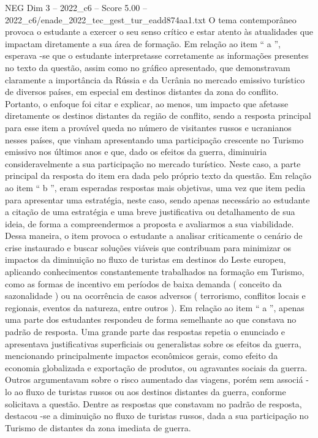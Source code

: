 \begin{textsample}{NEG Dim 3 – 2022\_c6 – Score 5.00 – 2022\_c6/enade\_2022\_tec\_gest\_tur\_eadd874aa1.txt}
O tema contemporâneo provoca o estudante a exercer o seu senso crítico e estar atento às atualidades que impactam diretamente a sua área de formação.
Em relação ao item “ a ”, esperava -se que o estudante interpretasse corretamente as informações presentes no texto da questão, assim como no gráfico apresentado, que demonstravam claramente a importância da Rússia e da Ucrânia no mercado emissivo turístico de diversos países, em especial em destinos distantes da zona do conflito.
Portanto, o enfoque foi citar e explicar, ao menos, um impacto que afetasse diretamente os destinos distantes da região de conflito, sendo a resposta principal para esse item a provável queda no número de visitantes russos e ucranianos nesses países, que vinham apresentando uma participação crescente no Turismo emissivo nos últimos anos e que, dado os efeitos da guerra, diminuiria consideravelmente a sua participação no mercado turístico.
Neste caso, a parte principal da resposta do item era dada pelo próprio texto da questão.
Em relação ao item “ b ”, eram esperadas respostas mais objetivas, uma vez que item pedia para apresentar uma estratégia, neste caso, sendo apenas necessário ao estudante a citação de uma estratégia e uma breve justificativa ou detalhamento de sua ideia, de forma a compreendermos a proposta e avaliarmos a sua viabilidade.
Dessa maneira, o item provoca o estudante a analisar criticamente o cenário de crise instaurado e buscar soluções viáveis que contribuam para minimizar os impactos da diminuição no fluxo de turistas em destinos do Leste europeu, aplicando conhecimentos constantemente trabalhados na formação em Turismo, como as formas de incentivo em períodos de baixa demanda ( conceito da sazonalidade ) ou na ocorrência de casos adversos ( terrorismo, conflitos locais e regionais, eventos da natureza, entre outros ).
Em relação ao item “ a ”, apenas uma parte dos estudantes respondeu de forma semelhante ao que constava no padrão de resposta.
Uma grande parte das respostas repetia o enunciado e apresentava justificativas superficiais ou generalistas sobre os efeitos da guerra, mencionando principalmente impactos econômicos gerais, como efeito da economia globalizada e exportação de produtos, ou agravantes sociais da guerra.
Outros argumentavam sobre o risco aumentado das viagens, porém sem associá -lo ao fluxo de turistas russos ou aos destinos distantes da guerra, conforme solicitava a questão.
Dentre as respostas que constavam no padrão de resposta, destacou -se a diminuição no fluxo de turistas russos, dada a sua participação no Turismo de distantes da zona imediata de guerra.

\end{textsample}
